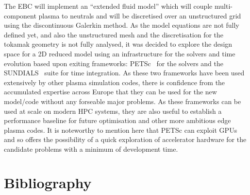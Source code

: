 \documentclass{article}
\begin{document}
The EBC will implement an ``extended fluid model'' which will couple multi-component 
plasma to neutrals and will be discretised over an unstructured grid using the 
discontinuous Galerkin method. As the model equations are not fully defined yet, 
and also the unstructured mesh and the discretisation for the tokamak geometry 
is not fully analysed, it was decided to explore the design space for a 2D reduced 
model using an infrastructure for the solvers and time evolution based upon exiting 
frameworks: PETSc~\cite{ref [15]} for the solvers and the SUNDIALS~\cite{ref [16]} suite for time integration. 
As these two frameworks have been used extensively by other plasma simulation codes, 
there is confidence from the accumulated expertise across Europe that they can 
be used for the new model/code without any forseable major problems. As these frameworks 
can be used at scale on modern HPC systems, they are also useful to establish a 
performance baseline for future optimisation and other more ambitious edge plasma 
codes. It is noteworthy to mention here that PETSc can exploit GPUs and so offers 
the possibility of a quick exploration of accelerator hardware for the candidate 
problems with a minimum of development time.\pagebreak{}

\section*{{\Large{}{ \textbf{Bibliography}}}}
\end{document}
